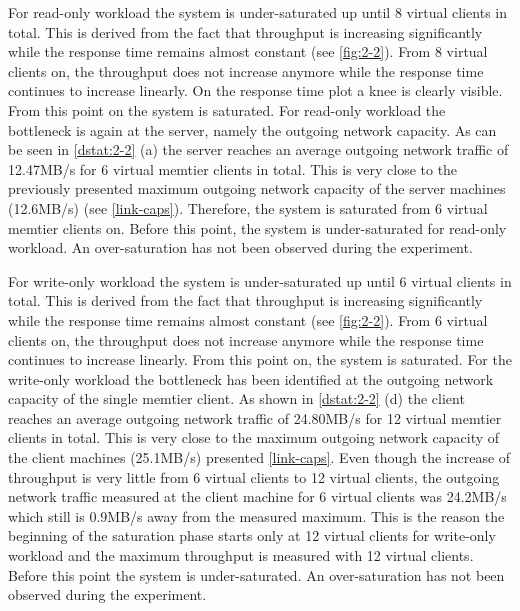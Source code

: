 \documentclass[11pt,a4paper]{article}
\begin{document}

For read-only workload the system is under-saturated up until 8 virtual clients in total. This is derived from the fact that throughput is increasing significantly while the response time remains almost constant (see \autoref{fig:2-2}). From 8 virtual clients on, the throughput does not increase anymore while the response time continues to increase linearly. On the response time plot a knee is clearly visible. From this point on the system is saturated.
For read-only workload the bottleneck is again at the server, namely the outgoing network capacity. As can be seen in \autoref{dstat:2-2} (a) the server reaches an average outgoing network traffic of 12.47MB/s for 6 virtual memtier clients in total. This is very close to the previously presented maximum outgoing network capacity of the server machines (12.6MB/s) (see \autoref{link-caps}). Therefore, the system is saturated from 6 virtual memtier clients on. Before this point, the system is under-saturated for read-only workload.  An over-saturation has not been observed during the experiment. 

For write-only workload the system is under-saturated up until 6 virtual clients in total. This is derived from the fact that throughput is increasing significantly while the response time remains almost constant (see \autoref{fig:2-2}). From 6 virtual clients on, the throughput does not increase anymore while the response time continues to increase linearly. From this point on, the system is saturated.
For the write-only workload the bottleneck has been identified at the outgoing network capacity of the single memtier client. As shown in \autoref{dstat:2-2} (d) the client reaches an average outgoing network traffic of 24.80MB/s for 12 virtual memtier clients in total. This is very close to the maximum outgoing network capacity of the client machines (25.1MB/s) presented \autoref{link-caps}. Even though the increase of throughput is very little from 6 virtual clients to 12 virtual clients, the outgoing network traffic measured at the client machine for 6 virtual clients was 24.2MB/s which still is 0.9MB/s away from the measured maximum. This is the reason the beginning of the saturation phase starts only at 12 virtual clients for write-only workload and the maximum throughput is measured with 12 virtual clients. Before this point the system is under-saturated. An over-saturation has not been observed during the experiment.
\end{document}
